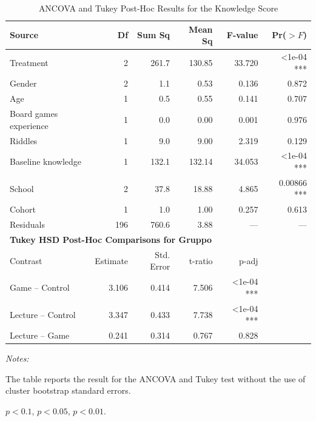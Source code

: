 \begin{table}[ht]
\centering
\caption{ANCOVA and Tukey Post-Hoc Results for the Knowledge Score}
\begin{tabular}{lrrrrr}
\toprule
\textbf{Source} & \textbf{Df} & \textbf{Sum Sq} & \textbf{Mean Sq} & \textbf{F-value} & \textbf{Pr($>F$)} \\
\midrule
Treatment & 2 & 261.7 & 130.85 & 33.720 & <1e-04 *** \\
Gender & 2 & 1.1 & 0.53 & 0.136 & 0.872 \\
Age & 1 & 0.5 & 0.55 & 0.141 & 0.707 \\
Board games experience & 1 & 0.0 & 0.00 & 0.001 & 0.976 \\
Riddles & 1 & 9.0 & 9.00 & 2.319 & 0.129 \\
Baseline knowledge & 1 & 132.1 & 132.14 & 34.053 & <1e-04 *** \\
School & 2 & 37.8 & 18.88 & 4.865 & 0.00866 *** \\
Cohort & 1 & 1.0 & 1.00 & 0.257 & 0.613 \\
Residuals & 196 & 760.6 & 3.88 & --- & --- \\
\midrule
\multicolumn{6}{l}{\textbf{Tukey HSD Post-Hoc Comparisons for Gruppo}} \\
\midrule
Contrast & Estimate & Std. Error & t-ratio & p-adj & \\
\midrule
Game -- Control & 3.106 & 0.414 & 7.506 & <1e-04 *** &  \\
Lecture -- Control & 3.347 & 0.433 & 7.738 & <1e-04 *** &  \\
Lecture -- Game & 0.241 & 0.314 & 0.767 & 0.828 &  \\
\bottomrule
\end{tabular}
\label{tab:ancova_tukey}
{\begin{flushleft}\parbox{\textwidth}{\tiny \hspace*{0.1cm}
\textit{Notes:}} The table reports the result for the ANCOVA and Tukey test without the use of cluster bootstrap standard errors.
\item \sym{*} $p<0.1$, \sym{**} $p<0.05$, \sym{***} $p<0.01$.
\end{flushleft}}
\end{table}

